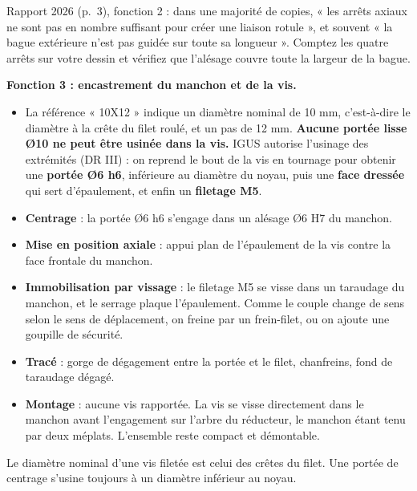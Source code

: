 \documentclass[11pt,a4paper]{article}
\providecommand{\tightlist}{\setlength{\itemsep}{0pt}\setlength{\parskip}{0pt}}
\begin{document}
\begin{piege}

Rapport 2026 (p.~3), fonction 2 : dans une majorité de copies, « les arrêts axiaux ne sont pas en nombre suffisant pour créer une liaison rotule », et souvent « la bague extérieure n'est pas guidée sur toute sa longueur ». Comptez les quatre arrêts sur votre dessin et vérifiez que l'alésage couvre toute la largeur de la bague.

\end{piege}

\textbf{Fonction 3 : encastrement du manchon et de la vis.}

\begin{itemize}
\tightlist
\item
  La référence « 10X12 » indique un diamètre nominal de 10 mm, c'est-à-dire le diamètre à la crête du filet roulé, et un pas de 12 mm. \textbf{Aucune portée lisse Ø10 ne peut être usinée dans la vis.} IGUS autorise l'usinage des extrémités (DR III) : on reprend le bout de la vis en tournage pour obtenir une \textbf{portée Ø6 h6}, inférieure au diamètre du noyau, puis une \textbf{face dressée} qui sert d'épaulement, et enfin un \textbf{filetage M5}.
\item
  \textbf{Centrage} : la portée Ø6 h6 s'engage dans un alésage Ø6 H7 du manchon.
\item
  \textbf{Mise en position axiale} : appui plan de l'épaulement de la vis contre la face frontale du manchon.
\item
  \textbf{Immobilisation par vissage} : le filetage M5 se visse dans un taraudage du manchon, et le serrage plaque l'épaulement. Comme le couple change de sens selon le sens de déplacement, on freine par un frein-filet, ou on ajoute une goupille de sécurité.
\item
  \textbf{Tracé} : gorge de dégagement entre la portée et le filet, chanfreins, fond de taraudage dégagé.
\item
  \textbf{Montage} : aucune vis rapportée. La vis se visse directement dans le manchon avant l'engagement sur l'arbre du réducteur, le manchon étant tenu par deux méplats. L'ensemble reste compact et démontable.
\end{itemize}

\begin{piege}

Le diamètre nominal d'une vis filetée est celui des crêtes du filet. Une portée de centrage s'usine toujours à un diamètre inférieur au noyau.

\end{piege}
\end{document}
